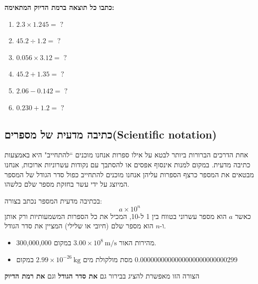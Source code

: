 \documentclass[
  hebrew,
  letterpaper,
  DIV=11,
  numbers=noendperiod]{scrreprt}
\providecommand{\tightlist}{%
  \setlength{\itemsep}{0pt}\setlength{\parskip}{0pt}}
\begin{document}
\textbf{כתבו כל תוצאה ברמת הדיוק המתאימה:}

\begin{enumerate}
\def\labelenumi{\arabic{enumi}.}
\tightlist
\item
  \(2.3 \times 1.245 = \; ?\)\\
\item
  \(45.2 \div 1.2 = \; ?\)\\
\item
  \(0.056 \times 3.12 = \; ?\)\\
\item
  \(45.2 + 1.35 = \; ?\)\\
\item
  \(2.06 - 0.142 = \; ?\)\\
\item
  \(0.230 + 1.2 = \; ?\)
\end{enumerate}

\subsection{\texorpdfstring{{כתיבה מדעית של מספרים}(Scientific
notation){}}{כתיבה מדעית של מספרים(Scientific notation)}}\label{ux5dbux5eaux5d9ux5d1ux5d4-ux5deux5d3ux5e2ux5d9ux5ea-ux5e9ux5dc-ux5deux5e1ux5e4ux5e8ux5d9ux5ddscientific-notation}

{אחת הדרכים הברורות ביותר לבטא על אילו ספרות אנחנו מוכנים ``להתחייב" היא
באמצעות כתיבה מדעית}. {במקום למנות אינסוף אפסים או להסתבך עם נקודות
עשרוניות ארוכות, אנחנו מבטאים את המספר כרצף הספרות עליהן אנחנו מוכנים
להתחייב כפול סדר הגודל של המספר המיוצג על ידי עשר בחזקת מספר שלם כלשהו.}

{בכתיבה מדעית המספר נכתב בצורה}: \[a \times 10^{n}\] {כאשר} \(a\) {הוא
מספר עשרוני בטווח בין 1 ל-10, המכיל את כל הספרות המשמעותיות ורק אותן\\
ו-}\(n\) {הוא מספר שלם (חיובי או שלילי) המציין את סדר הגודל}.

\begin{itemize}
\tightlist
\item
  {מהירות האור} \(3.00 \times 10^{8}\text{ m/s}\) {במקום} 300,000,000{.}
\item
  {מסת מולקולת מים} \(2.99 \times 10^{- 26}\text{ kg}\) {במקום}
  ‎0.0000000000000000000000000299‎
\end{itemize}

{הצורה הזו מאפשרת להציג בבירור גם \textbf{את סדר הגודל} וגם \textbf{את
רמת הדיוק}}
\end{document}
